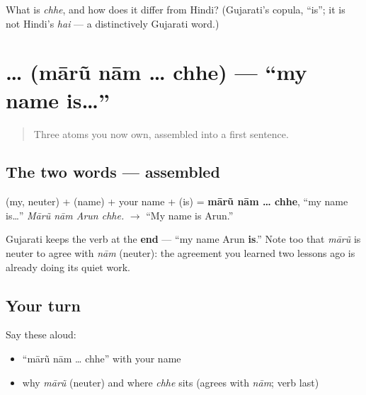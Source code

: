 \begin{tcolorbox}[breakable,colback=teal!4,colframe=teal!35!black,title={Before you move on}]
What is \emph{chhe}, and how does it differ from Hindi? (Gujarati's copula, \textquotedblleft{}is\textquotedblright{}; it is not Hindi's \emph{hai} — a distinctively Gujarati word.)
\end{tcolorbox}
\section[\gu{મારું} \gu{નામ} … \gu{છે}]{  …  (mārũ nām … chhe) — \textquotedblleft{}my name is…\textquotedblright{}}

\label{lesson:GU-C02-maarun-naam-chhe}



\begin{quote}
Three atoms you now own, assembled into a first sentence.
\end{quote}

\subsection*{The two words — assembled}
\textbf{} (my, neuter) + \textbf{} (name) + your name + \textbf{} (is) = \textbf{mārũ nām … chhe}, \textquotedblleft{}my name is…\textquotedblright{} \emph{Mārũ nām Arun chhe.} $\to$ \textquotedblleft{}My name is Arun.\textquotedblright{}

\begin{grammarlens}[title={Grammar Lens: the verb goes last}]
Gujarati keeps the verb at the \textbf{end} — \textquotedblleft{}my name Arun \textbf{is}.\textquotedblright{} Note too that \emph{mārũ} is neuter to agree with \emph{nām} (neuter): the agreement you learned two lessons ago is already doing its quiet work.
\end{grammarlens}

\subsection*{Your turn}
Say these aloud:

\begin{itemize}
\raggedright
  \item \textquotedblleft{}mārũ nām … chhe\textquotedblright{} with your name
  \item why \emph{mārũ} (neuter) and where \emph{chhe} sits (agrees with \emph{nām}; verb last)
\end{itemize}

